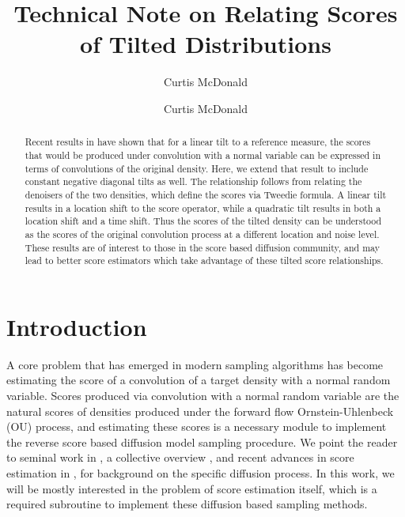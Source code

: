 \documentclass[11pt]{article}
\author{Curtis McDonald}
\title{Technical Note on Relating Scores of Tilted Distributions}
\author{Curtis McDonald}
\theoremstyle{proposition}
\theoremstyle{lemma}
\theoremstyle{corollary}
\theoremstyle{theorem}
\theoremstyle{definition}
\begin{document}
\maketitle

\begin{abstract}
Recent results in \cite[Lemma 3.3]{moitra2026steering} have shown that for a linear tilt to a reference measure, the scores that would be produced under convolution with a normal variable can be expressed in terms of convolutions of the original density. Here, we extend that result to include constant negative diagonal tilts as well. The relationship follows from relating the denoisers of the two densities, which define the scores via Tweedie formula. A linear tilt results in a location shift to the score operator, while a quadratic tilt results in both a location shift and a time shift. Thus the scores of the tilted density can be understood as the scores of the original convolution process at a different location and noise level. These results are of interest to those in the score based diffusion community, and may lead to better score estimators which take advantage of these tilted score relationships.
\end{abstract}

\section{Introduction}

A core problem that has emerged in modern sampling algorithms has become estimating the score of a convolution of a target density with a normal random variable. Scores produced via convolution with a normal random variable are the natural scores of densities produced under the forward flow Ornstein-Uhlenbeck (OU) process, and estimating these scores is a necessary module to implement the reverse score based diffusion model sampling procedure. We point the reader to seminal work in \cite{song2019generative,song2020score}, a collective overview \cite{yang2023diffusion}, and recent advances in score estimation in \cite{he2024zerothorder},\cite{young2026diffusion} for background on the specific diffusion process. In this work, we will be mostly interested in the problem of score estimation itself, which is a required subroutine to implement these diffusion based sampling methods.
\end{document}
